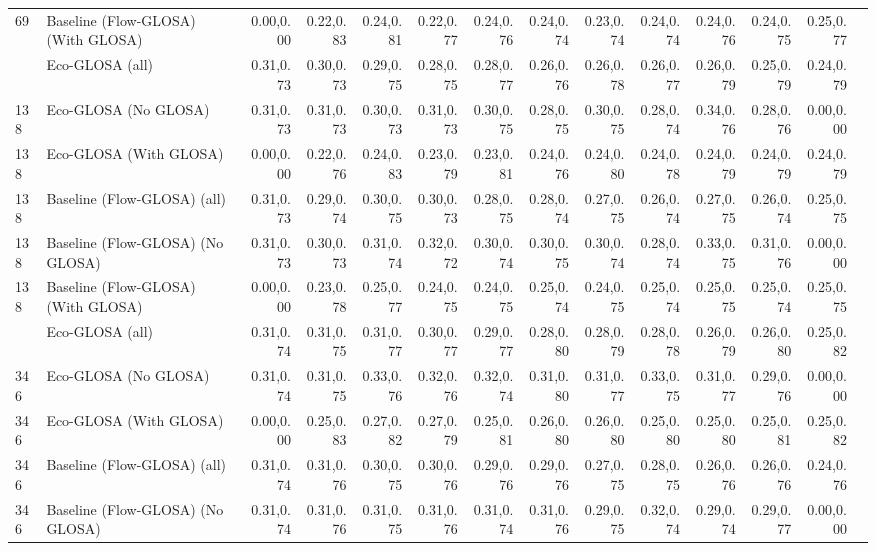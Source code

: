 \begin{table}[ht]
{\begin{tabular}{llrrrrrrrrrrrr}
        69   & Baseline (Flow-GLOSA) (With GLOSA) & 0.00,0.00 & 0.22,0.83 & 0.24,0.81 & 0.22,0.77 & 0.24,0.76 & 0.24,0.74 & 0.23,0.74 & 0.24,0.74 & 0.24,0.76 & 0.24,0.75 & 0.25,0.77 \\
        \addlinespace
        138  & Eco-GLOSA (all)                    & 0.31,0.73 & 0.30,0.73 & 0.29,0.75 & 0.28,0.75 & 0.28,0.77 & 0.26,0.76 & 0.26,0.78 & 0.26,0.77 & 0.26,0.79 & 0.25,0.79 & 0.24,0.79 \\
        138  & Eco-GLOSA (No GLOSA)               & 0.31,0.73 & 0.31,0.73 & 0.30,0.73 & 0.31,0.73 & 0.30,0.75 & 0.28,0.75 & 0.30,0.75 & 0.28,0.74 & 0.34,0.76 & 0.28,0.76 & 0.00,0.00 \\
        138  & Eco-GLOSA (With GLOSA)             & 0.00,0.00 & 0.22,0.76 & 0.24,0.83 & 0.23,0.79 & 0.23,0.81 & 0.24,0.76 & 0.24,0.80 & 0.24,0.78 & 0.24,0.79 & 0.24,0.79 & 0.24,0.79 \\
        138  & Baseline (Flow-GLOSA) (all)        & 0.31,0.73 & 0.29,0.74 & 0.30,0.75 & 0.30,0.73 & 0.28,0.75 & 0.28,0.74 & 0.27,0.75 & 0.26,0.74 & 0.27,0.75 & 0.26,0.74 & 0.25,0.75 \\
        138  & Baseline (Flow-GLOSA) (No GLOSA)   & 0.31,0.73 & 0.30,0.73 & 0.31,0.74 & 0.32,0.72 & 0.30,0.74 & 0.30,0.75 & 0.30,0.74 & 0.28,0.74 & 0.33,0.75 & 0.31,0.76 & 0.00,0.00 \\
        138  & Baseline (Flow-GLOSA) (With GLOSA) & 0.00,0.00 & 0.23,0.78 & 0.25,0.77 & 0.24,0.75 & 0.24,0.75 & 0.25,0.74 & 0.24,0.75 & 0.25,0.74 & 0.25,0.75 & 0.25,0.74 & 0.25,0.75 \\
        \addlinespace
        346  & Eco-GLOSA (all)                    & 0.31,0.74 & 0.31,0.75 & 0.31,0.77 & 0.30,0.77 & 0.29,0.77 & 0.28,0.80 & 0.28,0.79 & 0.28,0.78 & 0.26,0.79 & 0.26,0.80 & 0.25,0.82 \\
        346  & Eco-GLOSA (No GLOSA)               & 0.31,0.74 & 0.31,0.75 & 0.33,0.76 & 0.32,0.76 & 0.32,0.74 & 0.31,0.80 & 0.31,0.77 & 0.33,0.75 & 0.31,0.77 & 0.29,0.76 & 0.00,0.00 \\
        346  & Eco-GLOSA (With GLOSA)             & 0.00,0.00 & 0.25,0.83 & 0.27,0.82 & 0.27,0.79 & 0.25,0.81 & 0.26,0.80 & 0.26,0.80 & 0.25,0.80 & 0.25,0.80 & 0.25,0.81 & 0.25,0.82 \\
        346  & Baseline (Flow-GLOSA) (all)        & 0.31,0.74 & 0.31,0.76 & 0.30,0.75 & 0.30,0.76 & 0.29,0.76 & 0.29,0.76 & 0.27,0.75 & 0.28,0.75 & 0.26,0.76 & 0.26,0.76 & 0.24,0.76 \\
        346  & Baseline (Flow-GLOSA) (No GLOSA)   & 0.31,0.74 & 0.31,0.76 & 0.31,0.75 & 0.31,0.76 & 0.31,0.74 & 0.31,0.76 & 0.29,0.75 & 0.32,0.74 & 0.29,0.74 & 0.29,0.77 & 0.00,0.00 \\

\end{tabular}}
\end{table}
